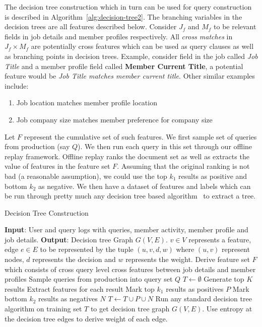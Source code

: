 The decision tree construction which in turn can be used for query
construction is described in Algorithm~\ref{alg:decision-tree2}. The branching
variables in the decision trees are all features described below. Consider $J_f$ 
and $M_f$ to be relevant fields in job details
and member profiles respectively. All {\it cross matches} in $J_f \times M_f$ are
potentially cross features which can be used as query clauses as well as
branching points in decision trees. Example, consider field in the job called
{\it Job Title} and a member profile field called {\bf Member Current Title}, a
potential feature would be {\it Job Title matches member current title}. Other
similar examples include:
\begin{enumerate}
    \item Job location matches member profile location
    \item Job company size matches member preference for company size
\end{enumerate}
Let $F$ represent the cumulative set of such features. We first sample set of
queries from production (say $Q$). We then run each query in this set through
our offline replay framework. Offline replay ranks the document set as well as
extracts the value of features in the feature set $F$. Assuming that the
original ranking is not bad (a reasonable assumption), we could use the top
$k_1$ results as positive and bottom $k_2$ as negative. We then have a dataset
of features and labels which can be run through pretty much any decision tree
based algorithm~\cite{quinlan1986induction} to extract a tree. 


\begin{algorithm}
\caption{Decision Tree Construction}\label{alg:decision-tree2}
\begin{algorithmic}[1]
  \State \textbf{Input}: User and query logs with queries, member activity, member profile and job
  details.
  \State \textbf{Output}: Decision tree Graph $G(V, E)$.
  $v \in V$ represents a feature, edge $e \in E$ to be represented by the tuple
  $(u, v, d, w)$ where $(u, v)$ represent nodes, $d$ represents the decision
  and $w$ represents the weight.
  \State Derive feature set $F$ which consists of cross query level cross
  features between job details and member profiles
  \State Sample queries from production into query set $Q$
  \State $T \gets \emptyset$
    \State Generate top $K$ results
    \State Extract features for each result
    \State Mark top $k_1$ results as positives $P$
    \State Mark bottom $k_2$ results as negatives $N$
    \State $T \gets T \cup P \cup N$
  \EndFor
  \State Run any standard decision tree algorithm on training set $T$ to get
  decision tree graph $G(V, E)$. 
  \State Use entropy at the decision tree edges to derive weight of each edge.
  \State %
\end{algorithmic}
\end{algorithm}

